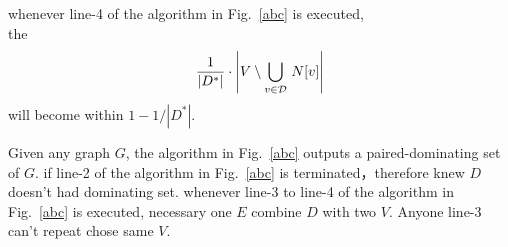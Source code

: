 \documentclass[12pt]{article}
\begin{document}
\begin{lemma}
whenever line-4 of the algorithm in Fig.~\ref{abc} is executed, \\the 
$$
\frac{1}{|D^*|}
\cdot\left|V\setminus \bigcup_{v\in {\cal D}}\,N[v]\right|
$$
will become within $1-1/|D^*|$.

\end{lemma}


\begin{lemma}
Given any graph $G$, the algorithm in Fig.~\ref{abc} outputs a paired-dominating set of $G$.
if line-2 of the algorithm in Fig.~\ref{abc} is terminated，therefore knew $D$ doesn't had dominating set.
whenever line-3 to line-4 of the algorithm in Fig.~\ref{abc} is executed, necessary one $E$ combine $D$ with two $V$. Anyone line-3 can't repeat chose same $V$.


\end{lemma}



\end{document}
